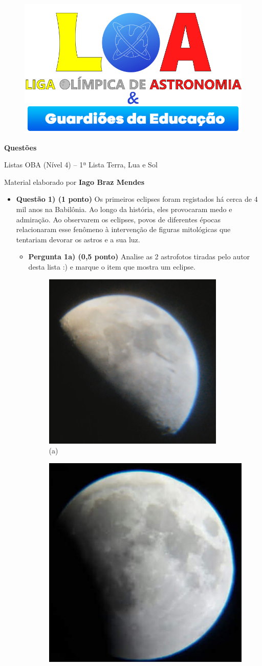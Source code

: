 \documentclass[a4paper, 12pt]{article}
\newcommand{\cabecalho}[4]
{
	\begin{figure}
		\centering
		\href{https://ligaolimpicadeastronomia.com.br/}{\includegraphics[scale=0.6]{./img/logos.png}}
	\end{figure}
	
	\begin{center}
		\begin{large}
			\textbf{#1}	
		\end{large}
			\linebreak Listas OBA (Nível 4) -- #2ª Lista
			\linebreak #3
		\end{center}
	
	\begin{flushright}
		Material elaborado por \textbf{#4}
	\end{flushright}
}
\begin{document}
	\cabecalho{Questões}{1}{Terra, Lua e Sol}{Iago Braz Mendes}
	
	\begin{flushleft}
	\begin{itemize}
		\item \textbf{Questão 1) (1 ponto)} Os primeiros eclipses foram registados há cerca de 4 mil anos na Babilônia. Ao longo da história, eles provocaram medo e admiração. Ao observarem os eclipses, povos de diferentes épocas relacionaram esse fenômeno à intervenção de figuras mitológicas que tentariam devorar os astros e a sua luz.
			\begin{itemize}
				\item \textbf{Pergunta 1a) (0,5 ponto)} Analise as 2 astrofotos tiradas pelo autor desta lista :) e marque o item que mostra um eclipse.
					\begin{multicols}{2}
						\begin{figure}[H]
							\centering
							\includegraphics[width=.6\linewidth]{./img/1a.png}
							\captionsetup{labelformat=empty}
							\caption{(a)}
						\end{figure}
						\begin{figure}[H]
							\centering
							\includegraphics[width=.6\linewidth]{./img/1b.jpg}

\end{figure}
\end{multicols}
\end{itemize}
\end{itemize}
\end{flushleft}
\end{document}
